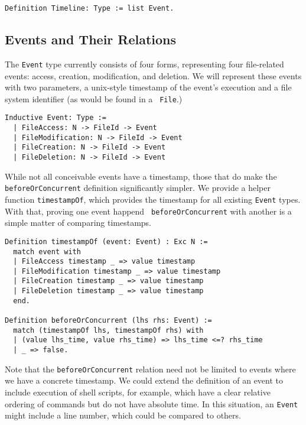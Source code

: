 \documentclass[nocopyrightspace]{sigplanconf}
\begin{document}
\begin{lstlisting}
Definition Timeline: Type := list Event.
\end{lstlisting}

\subsection{Events and Their Relations}

The {\tt Event} type currently consists of four forms, representing four
file-related events: access, creation, modification, and deletion. We will
represent these events with two parameters, a unix-style timestamp of the
event's execution and a file system identifier (as would be found in a {\tt
File}.)

\begin{lstlisting}
Inductive Event: Type :=
  | FileAccess: N -> FileId -> Event
  | FileModification: N -> FileId -> Event
  | FileCreation: N -> FileId -> Event
  | FileDeletion: N -> FileId -> Event
\end{lstlisting}

While not all conceivable events have a timestamp, those that do make the {\tt
beforeOrConcurrent} definition significantly simpler. We provide a helper
function {\tt timestampOf}, which provides the timestamp for all existing
{\tt Event} types. With that, proving one event happend {\tt
beforeOrConcurrent} with another is a simple matter of comparing timestamps.

\begin{lstlisting}
Definition timestampOf (event: Event) : Exc N :=
  match event with
  | FileAccess timestamp _ => value timestamp
  | FileModification timestamp _ => value timestamp
  | FileCreation timestamp _ => value timestamp
  | FileDeletion timestamp _ => value timestamp
  end.

Definition beforeOrConcurrent (lhs rhs: Event) :=
  match (timestampOf lhs, timestampOf rhs) with
  | (value lhs_time, value rhs_time) => lhs_time <=? rhs_time
  | _ => false.
\end{lstlisting}

Note that the {\tt beforeOrConcurrent} relation need not be limited to events
where we have a concrete timestamp. We could extend the definition of an event
to include execution of shell scripts, for example, which have a clear
relative ordering of commands but do not have absolute time. In this
situation, an {\tt Event} might include a line number, which could be compared
to others.
\end{document}
